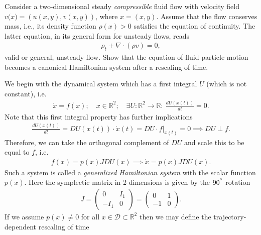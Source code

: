 \begin{exercise}
Consider a two-dimensional steady \emph{compressible} fluid flow with velocity field ${v(x})=\left(u(x,y),v(x,y)\right)$, where ${x}=\left(x,y\right)$. Assume that the flow conserves mass, i.e., its density function $\rho\left({x}\right)>0$ satisfies the equation of continuity. The latter equation, in its general form for unsteady flows, reads 
\begin{align}
\rho_{t}+\nabla\cdot\left(\rho{v}\right)=0,
\end{align}
valid or general, unsteady flow. Show that the equation of fluid particle motion becomes a canonical Hamiltonian system after a rescaling of time.
\end{exercise}

\begin{ex}
	We begin with the dynamical system which has a first integral $U$ (which is not constant), i.e.
	\begin{align}
		\dot{x} = f(x);\quad x \in \mathbb{R}^{2};\quad \exists U:\mathbb{R}^{2}\to \mathbb{R}:\ \frac{dU(x(t))}{dt}=0.
	\end{align}
	Note that this first integral property has further implications
	\begin{align}
		\frac{dU(x(t))}{dt} = DU(x(t)) \cdot \dot{x}(t) = DU \cdot \left.f\right|_{x(t)} = 0 \implies DU \perp f.
	\end{align}
Therefore, we can take the orthogonal complement of $DU$ and scale this to be equal to $f$, i.e.
\begin{align}
	f(x) = p(x) JDU(x) \implies \dot{x} = p(x) JDU(x).
\end{align}
Such a system is called a \emph{generalized Hamiltonian system} with the scalar function $p(x)$. Here the symplectic matrix in 2 dimensions is given by the $90^{\degree}$ rotation
\begin{align}
	J = 
	\begin{pmatrix}
		0 & I_{1}\\
		-I_{1} & 0 
	\end{pmatrix}
	=
	\begin{pmatrix}
		0 & 1 \\
		-1 & 0
	\end{pmatrix}
	.
\end{align}
If we assume $p(x)\neq0$ for all $x\in \mathcal{D} \subset \mathbb{R}^{2}$ then we may define the trajectory-dependent rescaling of time
\begin{align}

\end{align}
\end{ex}
